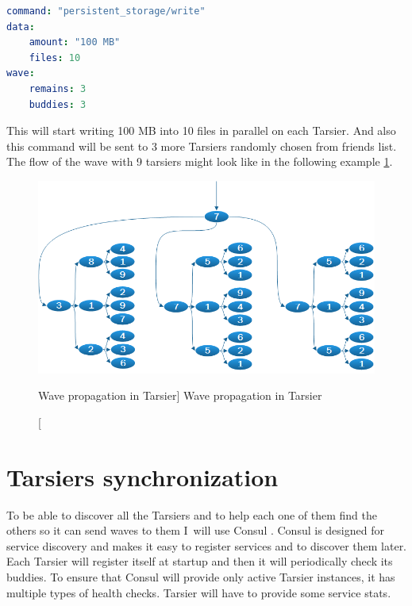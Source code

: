\begin{lstlisting}[language=yaml,caption=The \lstinline{persistent_storage/write} command body structure]
command: "persistent_storage/write"
data:
    amount: "100 MB"
    files: 10
wave: 
    remains: 3
    buddies: 3
\end{lstlisting}
 
This will start writing 100 MB into 10 files in parallel on each Tarsier. And also this command will be sent to 3 more Tarsiers randomly chosen from friends list. The flow of the wave with 9 tarsiers might look like in the following example \ref{fig:tarsier-wave}. 
                
\begin{figure}[htb]\centering
  \includegraphics[width=1\textwidth]{images/wave.png}
  \caption
    [Wave propagation in Tarsier]
    {Wave propagation in Tarsier}
  \label{fig:tarsier-wave}
\end{figure}

\section{Tarsiers synchronization}
To be able to discover all the Tarsiers and to help each one of them find the others so it can send waves to them I~will use Consul \cite{consul}. Consul is designed for service discovery and makes it easy to register services and to discover them later. Each Tarsier will register itself at startup and then it will periodically check its buddies. To ensure that Consul will provide only active Tarsier instances, it has multiple types of health checks. Tarsier will have to provide some service stats.

